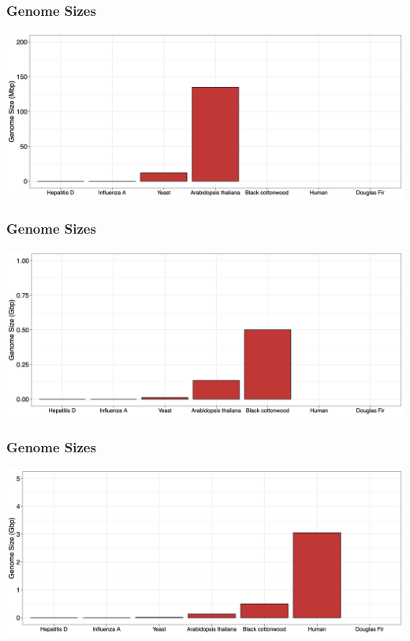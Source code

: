 \documentclass{beamer}
\begin{document}
\begin{frame}
	\frametitle{Genome Sizes}
	\centering	\includegraphics[keepaspectratio, width  =1\textwidth]{img/arabidopsis.png}\\
\end{frame}

\begin{frame}
	\frametitle{Genome Sizes}
	\centering	\includegraphics[keepaspectratio, width  =1\textwidth]{img/cottonwood.png}\\
\end{frame}

\begin{frame}
	\frametitle{Genome Sizes}
	\centering	\includegraphics[keepaspectratio, width  =1\textwidth]{img/human.png}\\
\end{frame}
\end{document}
